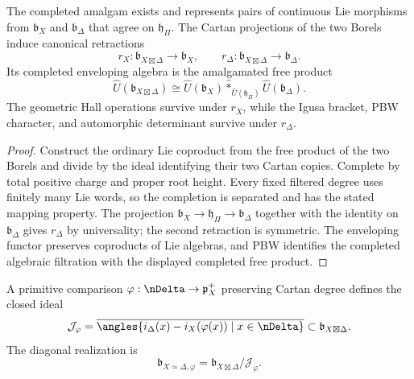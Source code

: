 \begin{theorem}
The completed amalgam exists and represents pairs of continuous Lie morphisms from $\mathfrak b_X$ and $\mathfrak b_\Delta$ that agree on $\mathfrak h_\Pi$.  The Cartan projections of the two Borels induce canonical retractions
\[
 r_X:\mathfrak b_{X\boxtimes\Delta}\longrightarrow\mathfrak b_X,
 \qquad
 r_\Delta:\mathfrak b_{X\boxtimes\Delta}\longrightarrow\mathfrak b_\Delta.
\]
Its completed enveloping algebra is the amalgamated free product
\[
 \widehat U(\mathfrak b_{X\boxtimes\Delta})
 \cong
 \widehat U(\mathfrak b_X)
 \widehat *_{\widehat U(\mathfrak h_\Pi)}
 \widehat U(\mathfrak b_\Delta).
\]
The geometric Hall operations survive under $r_X$, while the Igusa bracket, PBW character, and automorphic determinant survive under $r_\Delta$.
\end{theorem}
\begin{proof}
Construct the ordinary Lie coproduct from the free product of the two Borels and divide by the ideal identifying their two Cartan copies.  Complete by total positive charge and proper root height.  Every fixed filtered degree uses finitely many Lie words, so the completion is separated and has the stated mapping property.  The projection $\mathfrak b_X\to\mathfrak h_\Pi\to\mathfrak b_\Delta$ together with the identity on $\mathfrak b_\Delta$ gives $r_\Delta$ by universality; the second retraction is symmetric.  The enveloping functor preserves coproducts of Lie algebras, and PBW identifies the completed algebraic filtration with the displayed completed free product.
\end{proof}

\begin{definition}
A primitive comparison $\varphi:\nDelta\to\mathfrak p_X^+$ preserving Cartan degree defines the closed ideal
\[
 \mathcal J_\varphi
 =\overline{\angles{
   i_\Delta(x)-i_X(\varphi(x))\mid x\in\nDelta
 }}
 \subset\mathfrak b_{X\boxtimes\Delta}.
\]
The diagonal realization is
\[
 \mathfrak b_{X\simeq\Delta,\varphi}
 =\mathfrak b_{X\boxtimes\Delta}/\mathcal J_\varphi.
\]
\end{definition}

